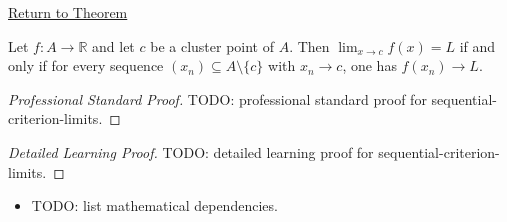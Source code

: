 \newpage
{}
\label{prf:sequential-criterion-limits}

\begin{remark*}[Return]
\hyperref[prop:sequential-criterion-limits]{Return to Theorem}
\end{remark*}

\begin{proposition*}
Let $f : A \to \mathbb{R}$ and let $c$ be a cluster point of $A$.
Then $\lim_{x\to c}f(x)=L$ if and only if for every sequence
$(x_n)\subseteq A\setminus\{c\}$ with $x_n\to c$, one has
$f(x_n)\to L$.

\smallskip\noindent
\end{proposition*}

\begin{proof}[Professional Standard Proof]
\LRAProofBodyStart
TODO: professional standard proof for sequential-criterion-limits.
\end{proof}

\begin{proof}[Detailed Learning Proof]
\LRAProofBodyStart
TODO: detailed learning proof for sequential-criterion-limits.
\end{proof}

\begin{remark*}
\end{remark*}

\begin{dependencies}
\begin{itemize}
  \item TODO: list mathematical dependencies.
\end{itemize}
\end{dependencies}

\clearpage
